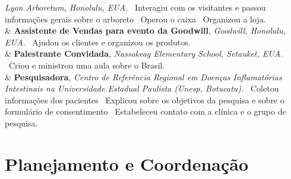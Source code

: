 \documentclass[11pt, a4paper]{article}
\newcommand{\Year}[1]{\fontsize{10pt}{0}\selectfont #1}
\begin{document}
\begin{EntriesTable}
	\newline
	\textit{Lyon Arboretum, Honolulu, EUA.}
	\newline
	\textbullet \ Interagiu com os visitantes e passou informações gerais 
	sobre o arboreto
	\textbullet \ Operou o caixa
	\textbullet \ Organizou a loja.
	\\
	\Year{2018}  &
	\textbf{Assistente de Vendas para evento da Goodwill},
	\newline
	\textit{Goodwill, Honolulu, EUA.}
	\newline
	\textbullet \ Ajudou os clientes e organizou os produtos.
		\\
	\Year{2017}  &
	\textbf{Palestrante Convidada},
	\newline
	\textit{Nassakeag Elementary School, Setauket, EUA.}
	\newline
	\textbullet \ Criou e ministrou uma aula sobre o Brasil.
	\\
	\Year{2009}  &
	\textbf{Pesquisadora},
	\newline
	\textit{Centro de Referência Regional em Doenças Inflamatórias 
	Intestinais na Universidade Estadual Paulista (Unesp, Botucatu).}
	\newline
	\textbullet \ Coletou informações dos pacientes
	\textbullet \ Explicou sobre os objetivos da pesquisa e sobre
	o formulário de consentimento
	\textbullet \ Estabeleceu contato com a clínica e o grupo de pesquisa.
	\\

\end{EntriesTable}


\section*{Planejamento e Coordenação}
\end{document}
